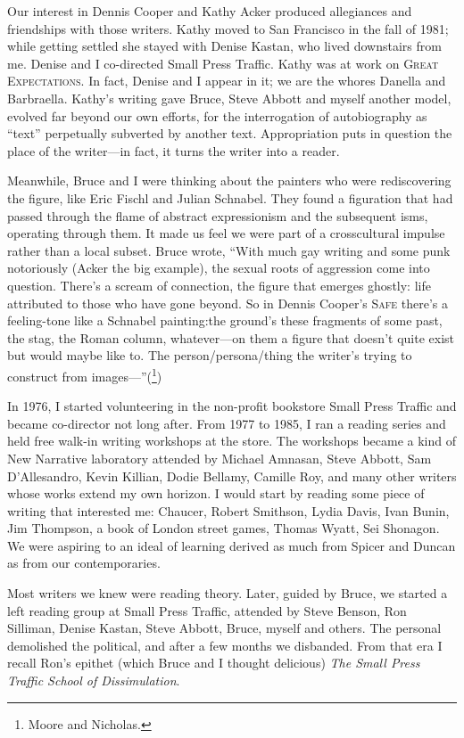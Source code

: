 \documentclass[
]{memoir}
\begin{document}
Our interest in Dennis Cooper and Kathy Acker produced allegiances and
friendships with those writers. Kathy moved to San Francisco in the fall
of 1981; while getting settled she stayed with Denise Kastan, who lived
downstairs from me. Denise and I co-directed Small Press Traffic. Kathy
was at work on \textsc{Great Expectations}. In fact, Denise and I appear
in it; we are the whores Danella and Barbraella. Kathy's writing gave
Bruce, Steve Abbott and myself another model, evolved far beyond our own
efforts, for the interrogation of autobiography as ``text'' perpetually
subverted by another text. Appropriation puts in question the place of
the writer---in fact, it turns the writer into a reader.

Meanwhile, Bruce and I were thinking about the painters who were
rediscovering the figure, like Eric Fischl and Julian Schnabel. They
found a figuration that had passed through the flame of abstract
expressionism and the subsequent isms, operating through them. It made
us feel we were part of a crosscultural impulse rather than a local
subset. Bruce wrote, ``With much gay writing and some punk notoriously
(Acker the big example), the sexual roots of aggression come into
question. There's a scream of connection, the figure that emerges
ghostly: life attributed to those who have gone beyond. So in Dennis
Cooper's \textsc{Safe} there's a feeling-tone like a Schnabel
painting:the ground's these fragments of some past, the stag, the Roman
column, whatever---on them a figure that doesn't quite exist but would
maybe like to. The person/persona/thing the writer's trying to construct
from images---''(\footnote{Moore and Nicholas.})

In 1976, I started volunteering in the non-profit bookstore Small Press
Traffic and became co-director not long after. From 1977 to 1985, I ran
a reading series and held free walk-in writing workshops at the store.
The workshops became a kind of New Narrative laboratory attended by
Michael Amnasan, Steve Abbott, Sam D'Allesandro, Kevin Killian, Dodie
Bellamy, Camille Roy, and many other writers whose works extend my own
horizon. I would start by reading some piece of writing that interested
me: Chaucer, Robert Smithson, Lydia Davis, Ivan Bunin, Jim Thompson, a
book of London street games, Thomas Wyatt, Sei Shonagon. We were
aspiring to an ideal of learning derived as much from Spicer and Duncan
as from our contemporaries.

Most writers we knew were reading theory. Later, guided by Bruce, we
started a left reading group at Small Press Traffic, attended by Steve
Benson, Ron Silliman, Denise Kastan, Steve Abbott, Bruce, myself and
others. The personal demolished the political, and after a few months we
disbanded. From that era I recall Ron's epithet (which Bruce and I
thought delicious) \emph{The Small Press Traffic School of
Dissimulation}.
\end{document}
